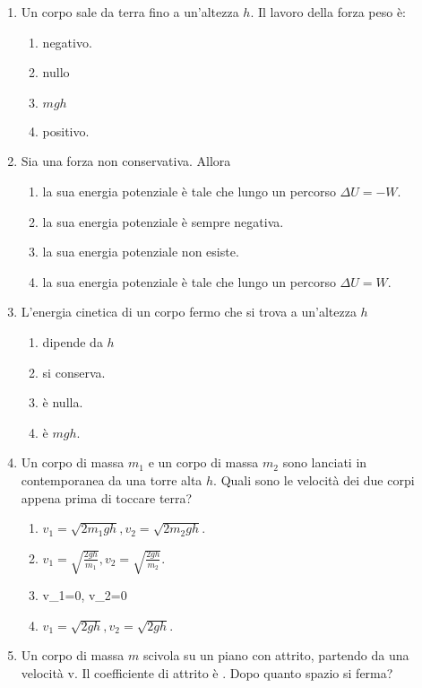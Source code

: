 \documentclass{article}
\begin{document}
\begin{enumerate}
\begin{enumerate}[label=\Alph*.]
  \end{enumerate}
  \item Un corpo sale da terra fino a un'altezza $h$. Il lavoro della forza peso è:
  \begin{enumerate}[label=\Alph*.]
    \item negativo.
    \item nullo
    \item $mgh$
    \item positivo.
  \end{enumerate}
  \item Sia  una forza non conservativa. Allora
  \begin{enumerate}[label=\Alph*.]
    \item la sua energia potenziale è tale che lungo un percorso $\Delta U=-W$.
    \item la sua energia potenziale è sempre negativa.
    \item la sua energia potenziale non esiste.
    \item la sua energia potenziale è tale che lungo un percorso $\Delta U=W$.
  \end{enumerate}
  \item L'energia cinetica di un corpo fermo che si trova a un'altezza $h$
  \begin{enumerate}[label=\Alph*.]
    \item dipende da $h$
    \item si conserva.
    \item è nulla.
    \item è $mgh$.
  \end{enumerate}
  \item Un corpo di massa $m_1$ e un corpo di massa $m_2$ sono lanciati in contemporanea da una torre alta $h$. Quali sono le velocità dei due corpi appena prima di toccare terra?
  \begin{enumerate}[label=\Alph*.]
    \item $v_1=\sqrt{2m_1gh}, v_2=\sqrt{2m_2gh}$.
    \item $v_1=\sqrt{\frac{2gh}{m_1}}, v_2=\sqrt{\frac{2gh}{m_2}}$.
    \item v_1=0, v_2=0
    \item $v_1=\sqrt{2gh}, v_2=\sqrt{2gh}$.
  \end{enumerate}
  \item Un corpo di massa $m$ scivola su un piano con attrito, partendo da una velocità v. Il coefficiente di attrito è \mu. Dopo quanto spazio si ferma?
  \begin{enumerate}[label=\Alph*.]

\end{enumerate}
\end{enumerate}
\end{document}
